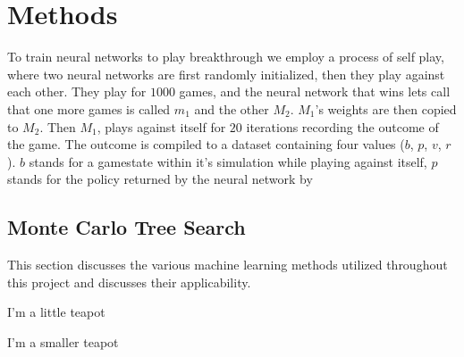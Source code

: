\chapter{Methods}

To train neural networks to play breakthrough we employ a process of self play, where two neural networks are first
randomly initialized, then they play against each other. They play for $1000$ games, and the neural network that wins
lets call that one more games is called $m_1$ and the other $M_2$. $M_1$'s weights are then copied to $M_2$. Then $M_1$,
plays against itself for $20$ iterations recording the outcome of the game. The outcome is compiled to a dataset containing
four values ($b$, $p$, $v$, $r$). $b$ stands for a gamestate within it's simulation while playing against itself, $p$ stands
for the policy returned by the neural network by 

\section{Monte Carlo Tree Search}




This section discusses the various machine learning methods utilized throughout this project 
and discusses their applicability.


I'm a little teapot


I'm a smaller teapot
